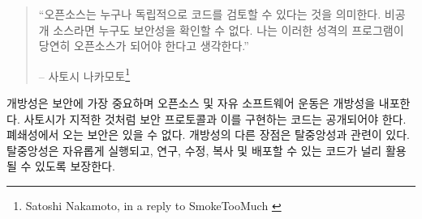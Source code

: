 			\begin{quotation}\begin{samepage}
					\begin{comment}
						\enquote{Being open source means anyone can independently review the code. If
							it was closed source, nobody could verify the security. I think it's
							essential for a program of this nature to be open source.}
						\begin{flushright} -- Satoshi Nakamoto\footnote{Satoshi Nakamoto, in a reply to SmokeTooMuch \cite{satoshi-open-source}}
						\end{comment}
						\enquote{오픈소스는 누구나 독립적으로 코드를 검토할 수 있다는 것을 의미한다.
							비공개 소스라면 누구도 보안성을 확인할 수 없다. 
							나는 이러한 성격의 프로그램이 당연히 오픈소스가 되어야 한다고 생각한다.}
						\begin{flushright} -- 사토시 나카모토\footnote{Satoshi Nakamoto, in a reply to SmokeTooMuch \cite{satoshi-open-source}}
				\end{flushright}\end{samepage}\end{quotation}
				
				\begin{comment}
					Openness is paramount to security and inherent in open source and the
					free software movement. As Satoshi pointed out, secure protocols and the
					code which implements them have to be open --- there is no security
					through obscurity. Another benefit is again related to decentralization:
					code which can be run, studied, modified, copied, and distributed freely
					ensures that it is spread far and wide.
				\end{comment}
				개방성은 보안에 가장 중요하며 오픈소스 및 자유 소프트웨어 운동은 개방성을 내포한다.
				사토시가 지적한 것처럼 보안 프로토콜과 이를 구현하는 코드는 공개되어야 한다.
				폐쇄성에서 오는 보안은 있을 수 없다.
				개방성의 다른 장점은 탈중앙성과 관련이 있다.
				탈중앙성은 자유롭게 실행되고, 연구, 수정, 복사 및 배포할 수 있는 코드가 널리 활용될 수 있도록 보장한다.
				
